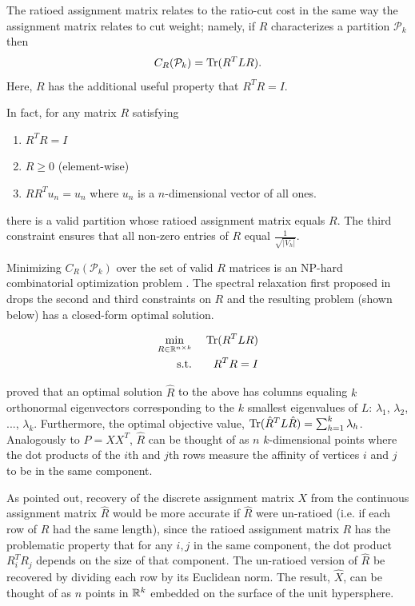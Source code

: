 The ratioed assignment matrix relates to the ratio-cut cost in the same
way the assignment matrix relates to cut weight; namely, if $R$
characterizes a partition $\mathcal{P}_k$ then
\[ C_R(\mathcal{P}_k) = \operatorname{Tr}(R^T L R). \]
Here, $R$ has the additional useful property that $R^T R = I$.

In fact, for any matrix $R$ satisfying
\begin{enumerate}
\item
$R^T R = I$

\item
$R \geq 0$ (element-wise)

\item
$R R^T u_n = u_n$ where $u_n$ is a $n$-dimensional vector of all ones.
\end{enumerate}
there is a valid partition whose ratioed assignment matrix equals $R$.
The third constraint ensures that all non-zero entries of $R$ equal
$\frac{1}{\sqrt{|V_h|}}$.

Minimizing $C_R(\mathcal{P}_k)$ over the set of valid $R$ matrices is
an NP-hard combinatorial optimization problem \cite{wang2003image}. The
spectral relaxation first proposed in \cite{Chan:94} drops the second
and third constraints on $R$ and the resulting problem (shown below)
has a closed-form optimal solution.

\begin{equation} \label{spectral_k-partition}
\begin{aligned}
\min_{R \in \mathbb{R}^{n \times k}} &\;& \operatorname{Tr}(R^T L R) \\
\text{s.t.}                  &\;& R^T R = I    \\
\end{aligned}
\end{equation}

\cite{Fan:50} proved that an optimal solution $\hat{R}$ to the above
has columns equaling $k$ orthonormal eigenvectors corresponding to
the $k$ smallest eigenvalues of $L$:
$\lambda_1$, $\lambda_2$, ..., $\lambda_k$.
Furthermore, the optimal objective value,
$\operatorname{Tr}(\hat{R}^T L \hat{R}) = \sum_{h=1}^k \lambda_h$.
Analogously to $P = X X^T$, $\hat{R}$ can be thought of as $n$
$k$-dimensional points where the dot products of the $i$th and $j$th
rows measure the affinity of vertices $i$ and $j$ to be in the same
component.

As \cite{Chan:94} pointed out, recovery of the discrete assignment
matrix $X$ from the continuous assignment matrix $\hat{R}$ would be more
accurate if $\hat{R}$ were un-ratioed (i.e. if each row of $R$ had the
same length), since the ratioed assignment matrix $R$ has the
problematic property that for any $i,j$ in the same component, the dot
product $R_i^T R_j$ depends on the size of that component.
The un-ratioed version of $\hat{R}$ be recovered by dividing each row
by its Euclidean norm. The result, $\hat{X}$, can be thought of as $n$
points in $\mathbb{R}^k$ embedded on the surface of the unit hypersphere.

